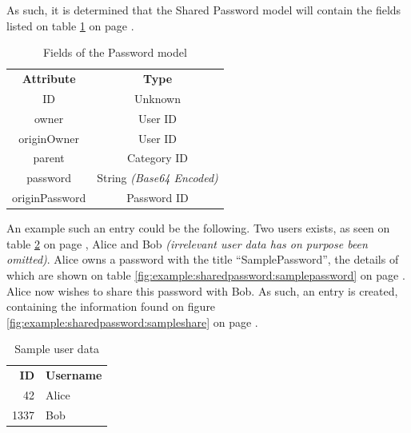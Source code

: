 			As such, it is determined that the Shared Password model will contain the fields listed on table \ref{fig:model:sharedpassword} on page \pageref{fig:model:sharedpassword}. 

			\begin{table}[p]
				\centering
				\begin{tabular}{c|c}
					\textbf{Attribute} 		& \textbf{Type} 		\\
					ID 						& Unknown 		\\
					owner 					& User ID \\
					originOwner 			& User ID \\
					parent 					& Category ID \\
					password 				& String \emph{(Base64 Encoded)} \\
					originPassword 			& Password ID 		\\
				\end{tabular}
				\caption{Fields of the Password model}
				\label{fig:model:sharedpassword}
			\end{table}

			An example such an entry could be the following. Two users exists, as seen on table \ref{fig:example:sharedpassword:users} on page \pageref{fig:example:sharedpassword:users}, Alice and Bob \emph{(irrelevant user data has on purpose been omitted)}. Alice owns a password with the title ``SamplePassword'', the details of which are shown on table \ref{fig:example:sharedpassword:samplepassword} on page \pageref{fig:example:sharedpassword:samplepassword}. Alice now wishes to share this password with Bob. As such, an entry is created, containing the information found on figure \ref{fig:example:sharedpassword:sampleshare} on page \pageref{fig:example:sharedpassword:sampleshare}.
			\begin{table}[p]
				\centering
				\begin{tabular}{r|l}
					\textbf{ID} 		& \textbf{Username} \\
					42 					& Alice 			\\
					1337  				& Bob 				\\
				\end{tabular}
				\caption{Sample user data}
				\label{fig:example:sharedpassword:users}
			\end{table}


